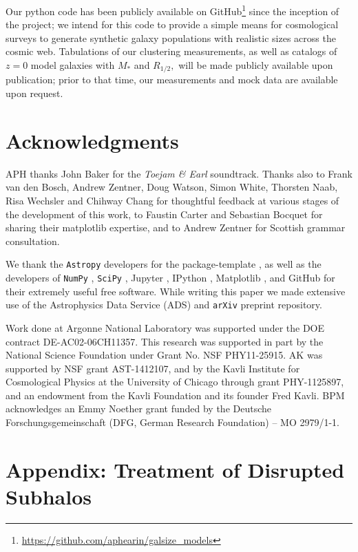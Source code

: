 \documentclass[usenatbib,usegraphicx,letterpaper]{mn2e}
\newcommand{\rhalf}{R_{1/2}}
\newcommand{\mstar}{M_{\ast}}
\begin{document}
Our python code has been publicly available on GitHub\footnote{\url{https://github.com/aphearin/galsize_models}} since the inception of the project; we intend for this code to provide a simple means for cosmological surveys to generate synthetic galaxy populations with realistic sizes across the cosmic web. Tabulations of our clustering measurements, as well as catalogs of $z=0$ model galaxies with $\mstar$ and $\rhalf,$ will be made publicly available upon publication; prior to that time, our measurements and mock data are available upon request. 

\section*{Acknowledgments}

APH thanks John Baker for the {\em Toejam \& Earl} soundtrack. Thanks also to Frank van den Bosch, Andrew Zentner, Doug Watson, Simon White, Thorsten Naab, Risa Wechsler and Chihway Chang for thoughtful feedback at various stages of the development of this work, to Faustin Carter and Sebastian Bocquet for sharing their matplotlib expertise, and to Andrew Zentner for Scottish grammar consultation.

We thank the {\tt Astropy} developers for the package-template \citep{astropy}, as well as the developers of {\tt NumPy} \citep{numpy_ndarray}, {\tt SciPy} \citep{scipy}, Jupyter \citep{jupyter}, IPython \citep{ipython}, Matplotlib \citep{matplotlib}, and GitHub for their extremely useful free software. While writing this paper we made extensive use of the Astrophysics Data Service (ADS) and {\tt arXiv} preprint repository.

Work done at Argonne National Laboratory was supported under the DOE contract DE-AC02-06CH11357. This research was supported in part by the National Science Foundation under Grant No. NSF PHY11-25915.  AK was  supported by NSF grant  AST-1412107, and by the Kavli Institute for Cosmological Physics at the University of Chicago through grant PHY-1125897, and an endowment from the Kavli Foundation and its founder Fred Kavli. BPM acknowledges an Emmy Noether grant funded by the Deutsche Forschungsgemeinschaft (DFG, German Research Foundation) -- MO 2979/1-1.



\newpage
\section*{Appendix: Treatment of Disrupted Subhalos}
\end{document}
